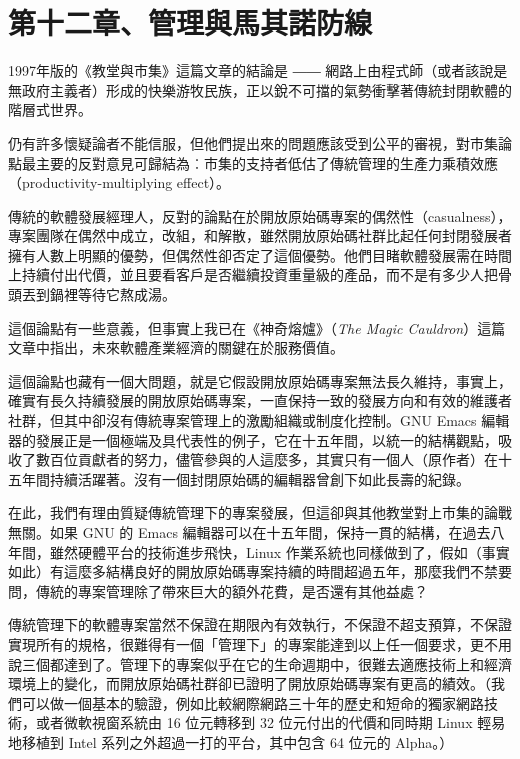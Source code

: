 \documentclass[12pt, a5paper]{book}
\begin{document}
\newpage
\section{第十二章、管理與馬其諾防線}\label{ux7b2cux5341ux4e8cux7ae0ux7ba1ux7406ux8207ux99acux5176ux8afeux9632ux7dda}

1997年版的《教堂與市集》這篇文章的結論是 ――
網路上由程式師（或者該說是無政府主義者）形成的快樂游牧民族，正以銳不可擋的氣勢衝擊著傳統封閉軟體的階層式世界。

仍有許多懷疑論者不能信服，但他們提出來的問題應該受到公平的審視，對市集論點最主要的反對意見可歸結為︰市集的支持者低估了傳統管理的生產力乘積效應（productivity-multiplying
effect）。

傳統的軟體發展經理人，反對的論點在於開放原始碼專案的偶然性（casualness），專案團隊在偶然中成立，改組，和解散，雖然開放原始碼社群比起任何封閉發展者擁有人數上明顯的優勢，但偶然性卻否定了這個優勢。他們目睹軟體發展需在時間上持續付出代價，並且要看客戶是否繼續投資重量級的產品，而不是有多少人把骨頭丟到鍋裡等待它熬成湯。

這個論點有一些意義，但事實上我已在《神奇熔爐》（\emph{The Magic
Cauldron}）這篇文章中指出，未來軟體產業經濟的關鍵在於服務價值。

這個論點也藏有一個大問題，就是它假設開放原始碼專案無法長久維持，事實上，確實有長久持續發展的開放原始碼專案，一直保持一致的發展方向和有效的維護者社群，但其中卻沒有傳統專案管理上的激勵組織或制度化控制。GNU
Emacs
編輯器的發展正是一個極端及具代表性的例子，它在十五年間，以統一的結構觀點，吸收了數百位貢獻者的努力，儘管參與的人這麼多，其實只有一個人（原作者）在十五年間持續活躍著。沒有一個封閉原始碼的編輯器曾創下如此長壽的紀錄。

在此，我們有理由質疑傳統管理下的專案發展，但這卻與其他教堂對上市集的論戰無關。如果
GNU 的 Emacs
編輯器可以在十五年間，保持一貫的結構，在過去八年間，雖然硬體平台的技術進步飛快，Linux
作業系統也同樣做到了，假如（事實如此）有這麼多結構良好的開放原始碼專案持續的時間超過五年，那麼我們不禁要問，傳統的專案管理除了帶來巨大的額外花費，是否還有其他益處？

傳統管理下的軟體專案當然不保證在期限內有效執行，不保證不超支預算，不保證實現所有的規格，很難得有一個「管理下」的專案能達到以上任一個要求，更不用說三個都達到了。管理下的專案似乎在它的生命週期中，很難去適應技術上和經濟環境上的變化，而開放原始碼社群卻已證明了開放原始碼專案有更高的績效。（我們可以做一個基本的驗證，例如比較網際網路三十年的歷史和短命的獨家網路技術，或者微軟視窗系統由
16 位元轉移到 32 位元付出的代價和同時期 Linux 輕易地移植到 Intel
系列之外超過一打的平台，其中包含 64 位元的 Alpha。）
\end{document}
